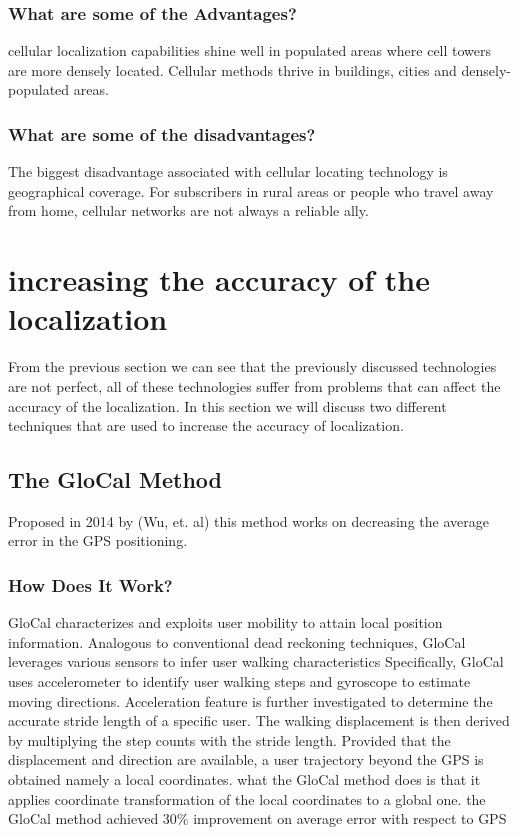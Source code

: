 \subsubsection{What are some of the Advantages?}
cellular localization  capabilities shine well in populated areas where cell towers are more densely located.
Cellular methods thrive in buildings, cities and densely-populated areas.\cite{web:agmonitoring}
\subsubsection{What are some of the disadvantages?}
The biggest disadvantage associated with cellular locating technology is geographical coverage.
For subscribers in rural areas or people who travel away from home, cellular networks are not always a reliable ally.\cite{web:agmonitoring}
\section{increasing the accuracy of the localization}
From the previous section we can see that the previously discussed technologies are not perfect, all of these technologies suffer from problems that can affect the accuracy of the localization. In this section we will discuss two different techniques that are used to increase the accuracy of localization.
\subsection{The GloCal Method}
Proposed in 2014 by (Wu, et. al)\cite{wu} this method works on decreasing the average error in the GPS positioning.
\subsubsection{How Does It Work?}
GloCal characterizes and exploits user mobility to attain local position information. Analogous to conventional dead reckoning techniques, GloCal leverages various sensors to infer user walking characteristics Specifically,
GloCal uses accelerometer to identify user walking steps and gyroscope to estimate moving directions. Acceleration feature is further investigated to determine the accurate stride length of a specific user. The walking displacement is then derived by multiplying the step counts with the stride length. Provided that the displacement and direction are available, a user trajectory beyond the GPS is obtained namely a local coordinates. what the GloCal method does is that it applies coordinate transformation of the local coordinates to a global one. 
the GloCal method achieved  30\% improvement on average error with respect to GPS 
